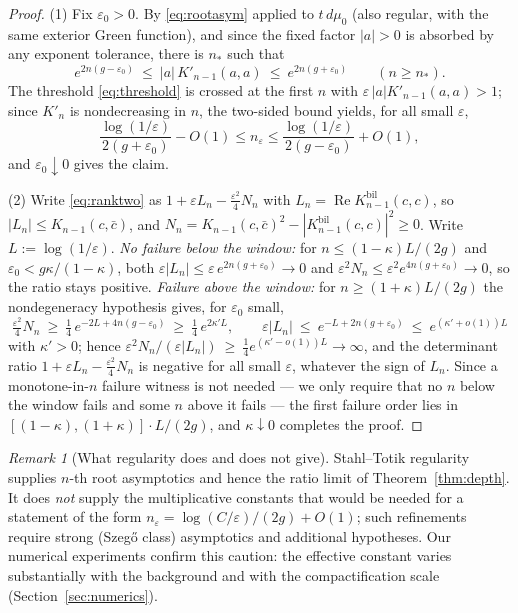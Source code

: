 \documentclass[11pt]{amsart}
\theoremstyle{definition}
\theoremstyle{remark}
\newtheorem{remark}[theorem]{Remark}
\newcommand{\dd}{\,d}
\newcommand{\eps}{\varepsilon}
\DeclareMathOperator{\Rea}{Re}
\begin{document}
\begin{proof}
(1) Fix $\eps_0>0$. By \eqref{eq:rootasym} applied to $t\dd\mu_0$ (also
regular, with the same exterior Green function), and since the fixed factor
$|a|>0$ is absorbed by any exponent tolerance, there is $n_*$ such that
\[
e^{2n(g-\eps_0)}\ \le\ |a|\,K'_{n-1}(a,a)\ \le\ e^{2n(g+\eps_0)}
\qquad(n\ge n_*).
\]
The threshold \eqref{eq:threshold} is crossed at the first $n$ with
$\eps\,|a|K'_{n-1}(a,a)>1$; since $K'_n$ is nondecreasing in $n$, the
two-sided bound yields, for all small $\eps$,
\[
\frac{\log(1/\eps)}{2(g+\eps_0)}-O(1)
\le n_\eps\le
\frac{\log(1/\eps)}{2(g-\eps_0)}+O(1),
\]
and $\eps_0\downarrow0$ gives the claim.

(2) Write \eqref{eq:ranktwo} as $1+\eps L_n-\tfrac{\eps^2}4 N_n$ with
$L_n=\Rea K^{\mathrm{bil}}_{n-1}(c,c)$, so $|L_n|\le K_{n-1}(c,\bar c)$, and
$N_n=K_{n-1}(c,\bar c)^2-|K^{\mathrm{bil}}_{n-1}(c,c)|^2\ge0$. Write
$L:=\log(1/\eps)$. \emph{No failure below the window:} for
$n\le(1-\kappa)L/(2g)$ and $\eps_0<g\kappa/(1-\kappa)$, both
$\eps|L_n|\le\eps\,e^{2n(g+\eps_0)}\to0$ and
$\eps^2N_n\le\eps^2e^{4n(g+\eps_0)}\to0$, so the ratio stays positive.
\emph{Failure above the window:} for $n\ge(1+\kappa)L/(2g)$ the
nondegeneracy hypothesis gives, for $\eps_0$ small,
\[
\tfrac{\eps^2}4N_n\ \ge\ \tfrac14\,e^{-2L+4n(g-\eps_0)}
\ \ge\ \tfrac14\,e^{2\kappa'L},
\qquad
\eps|L_n|\ \le\ e^{-L+2n(g+\eps_0)}\ \le\ e^{(\kappa'+o(1))L}
\]
with $\kappa'>0$; hence
$\eps^2N_n/(\eps|L_n|)\ \ge\ \tfrac14 e^{(\kappa'-o(1))L}\to\infty$, and the
determinant ratio $1+\eps L_n-\tfrac{\eps^2}4N_n$ is negative for all small
$\eps$, whatever the sign of $L_n$. Since a monotone-in-$n$ failure witness
is not needed --- we only require that no $n$ below the window fails and
some $n$ above it fails --- the first failure order lies in
$[(1-\kappa),(1+\kappa)]\cdot L/(2g)$, and $\kappa\downarrow0$ completes the
proof.
\end{proof}

\begin{remark}[What regularity does and does not give]\label{rem:noO1}
Stahl--Totik regularity supplies $n$-th root asymptotics and hence the ratio
limit of Theorem~\ref{thm:depth}. It does \emph{not} supply the
multiplicative constants that would be needed for a statement of the form
$n_\eps=\log(C/\eps)/(2g)+O(1)$; such refinements require strong (Szeg\H o
class) asymptotics and additional hypotheses. Our numerical experiments
confirm this caution: the effective constant varies substantially with the
background and with the compactification scale (Section~\ref{sec:numerics}).
\end{remark}
\end{document}
